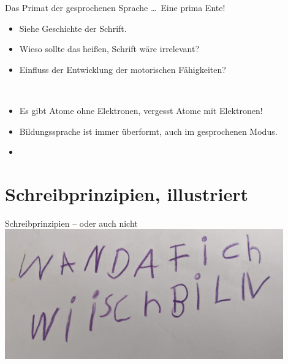 \begin{frame}
  {Das Primat der gesprochenen Sprache \ldots\ Eine prima Ente!}
  \\
  \Viertelzeile
  \begin{itemize}[<+->]
    \item Siehe Geschichte der Schrift.
  \end{itemize}
  \Halbzeile
  \Viertelzeile
  \begin{itemize}[<+->]
    \item Wieso sollte das heißen, Schrift wäre irrelevant?
    \item Einfluss der Entwicklung der motorischen Fähigkeiten?\\
  \end{itemize}
  \Halbzeile
  \\
  \Viertelzeile
  \begin{itemize}[<+->]
    \item Es gibt Atome ohne Elektronen, vergesst Atome mit Elektronen!
  \end{itemize}
  \Halbzeile
  \Viertelzeile
  \begin{itemize}[<+->]
    \item Bildungssprache ist immer überformt, auch im gesprochenen Modus.
    \item {}
  \end{itemize}
\end{frame}



\section[Prinzipien]{Schreibprinzipien, illustriert}

\begin{frame}
  {Schreibprinzipien -- oder auch nicht}
  \centering 
  \includegraphics[width=0.9\textwidth]{graphics/wii}\\
  \Halbzeile
\end{frame}

